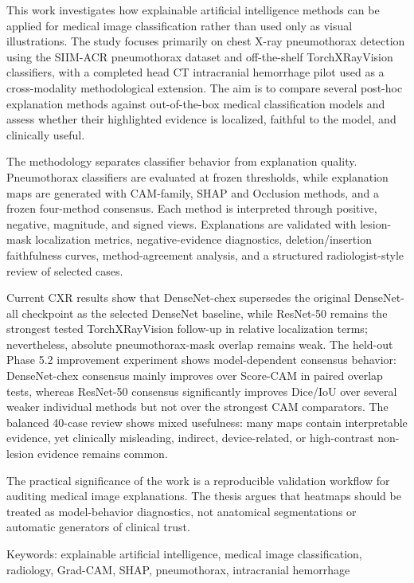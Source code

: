 This work investigates how explainable artificial intelligence methods
can be applied for medical image classification rather than used only as
visual illustrations. The study focuses primarily on chest X-ray
pneumothorax detection using the SIIM-ACR pneumothorax dataset and
off-the-shelf TorchXRayVision classifiers, with a completed head CT
intracranial hemorrhage pilot used as a cross-modality methodological
extension. The aim is to compare several post-hoc explanation methods
against out-of-the-box medical classification models and assess whether
their highlighted evidence is localized, faithful to the model, and
clinically useful.

The methodology separates classifier behavior from explanation quality.
Pneumothorax classifiers are evaluated at frozen thresholds, while
explanation maps are generated with CAM-family, SHAP and Occlusion
methods, and a frozen four-method consensus. Each method is interpreted
through positive, negative, magnitude, and signed views. Explanations
are validated with lesion-mask localization metrics, negative-evidence
diagnostics, deletion/insertion faithfulness curves, method-agreement
analysis, and a structured radiologist-style review of selected cases.

Current CXR results show that DenseNet-chex supersedes the original
DenseNet-all checkpoint as the selected DenseNet baseline, while
ResNet-50 remains the strongest tested TorchXRayVision follow-up in
relative localization terms; nevertheless, absolute pneumothorax-mask
overlap remains weak. The held-out Phase 5.2 improvement experiment
shows model-dependent consensus behavior: DenseNet-chex consensus mainly
improves over Score-CAM in paired overlap tests, whereas ResNet-50
consensus significantly improves Dice/IoU over several weaker individual
methods but not over the strongest CAM comparators. The balanced 40-case
review shows mixed usefulness: many maps contain interpretable evidence,
yet clinically misleading, indirect, device-related, or high-contrast
non-lesion evidence remains common.

The practical significance of the work is a reproducible validation
workflow for auditing medical image explanations. The thesis argues that
heatmaps should be treated as model-behavior diagnostics, not anatomical
segmentations or automatic generators of clinical trust.

Keywords: explainable artificial intelligence, medical image
classification, radiology, Grad-CAM, SHAP, pneumothorax, intracranial
hemorrhage
